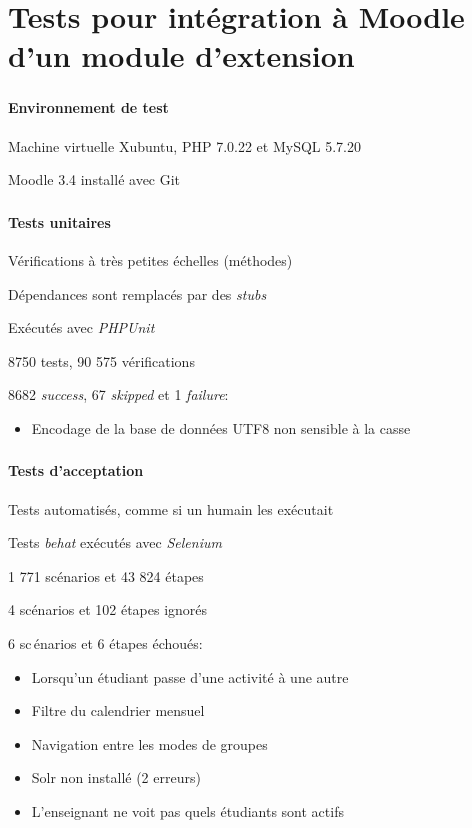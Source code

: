\documentclass{beamer}
\begin{document}
  \section[Tests]{Tests pour int\'egration \`a Moodle d'un module d'extension}
  \begin{frame}
  \frametitle{\insertsection}
  \framesubtitle{Environnement de test}
  Machine virtuelle Xubuntu, PHP 7.0.22 et MySQL 5.7.20
  
  Moodle 3.4 install\'e avec Git
  \end{frame}
  
  \begin{frame}
  \frametitle{\insertsection}
  \framesubtitle{Tests unitaires}
  V\'erifications \`a tr\`es petites \'echelles (m\'ethodes)
  
  D\'ependances sont remplac\'es par des \textit{stubs}
  
  Ex\'ecut\'es avec \textit{PHPUnit}
  
  \bigskip
  
  8750 tests, 90 575 v\'erifications
  
  8682 \textit{success}, 67 \textit{skipped} et 1 \textit{failure}:
  \begin{itemize}
    \item Encodage de la base de donn\'ees UTF8 non sensible \`a la casse
  \end{itemize}
  \end{frame}
  
  \begin{frame}
  \frametitle{\insertsection}
  \framesubtitle{Tests d'acceptation}
  Tests automatis\'es, comme si un humain les ex\'ecutait
  
  Tests \textit{behat} ex\'ecut\'es avec \textit{Selenium}
  
  \bigskip
  
  1 771 sc\'enarios et 43 824 \'etapes
  
  4 sc\'enarios et 102 \'etapes ignor\'es
  
  6 sc\,énarios et 6 \'etapes \'echou\'es:
  \begin{itemize}
    \item Lorsqu'un \'etudiant passe d'une activit\'e \`a une autre
    \item Filtre du calendrier mensuel
    \item Navigation entre les modes de groupes
    \item Solr non install\'e (2 erreurs)
    \item L'enseignant ne voit pas quels \'etudiants sont actifs
  \end{itemize}
  \end{frame}
  
\end{document}
